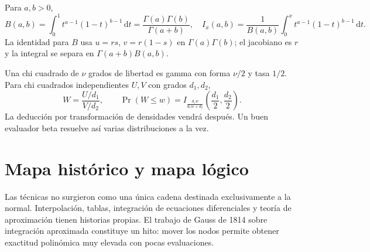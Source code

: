 \documentclass[11pt,a4paper]{article}
\newcommand{\dd}{\,\mathrm d}
\theoremstyle{definition}
\begin{document}
Para $a,b>0$,
\[
B(a,b)=\int_0^1 t^{a-1}(1-t)^{b-1}\dd t
=\frac{\Gamma(a)\Gamma(b)}{\Gamma(a+b)},\quad
I_x(a,b)=\frac1{B(a,b)}\int_0^x t^{a-1}(1-t)^{b-1}\dd t.
\]
La identidad para $B$ usa $u=rs$, $v=r(1-s)$ en $\Gamma(a)\Gamma(b)$; el jacobiano es $r$ y la integral se separa en $\Gamma(a+b)B(a,b)$.

Una chi cuadrado de $\nu$ grados de libertad es gamma con forma $\nu/2$ y tasa $1/2$. Para chi cuadrados independientes $U,V$ con grados $d_1,d_2$,
\[
W=\frac{U/d_1}{V/d_2},\qquad
\Pr(W\le w)=I_{\frac{d_1w}{d_1w+d_2}}\left(\frac{d_1}2,\frac{d_2}2\right).
\]
La deducción por transformación de densidades vendrá después. Un buen evaluador beta resuelve así varias distribuciones a la vez.

\section{Mapa histórico y mapa lógico}
Las técnicas no surgieron como una única cadena destinada exclusivamente a la normal. Interpolación, tablas, integración de ecuaciones diferenciales y teoría de aproximación tienen historias propias. El trabajo de Gauss de 1814 sobre integración aproximada constituye un hito: mover los nodos permite obtener exactitud polinómica muy elevada con pocas evaluaciones.
\end{document}
